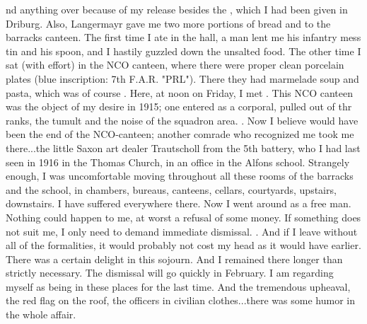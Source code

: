 nd anything over because of my release besides the , which I had been given in Driburg. Also, Langermayr gave me two more portions of bread and  to the barracks canteen. The first time I ate in the  hall, a man lent me his infantry mess tin and his spoon, and I hastily guzzled down the unsalted food. The other time I sat (with effort) in the NCO canteen, where there were proper clean porcelain plates (blue inscription: 7th F.A.R. "PRL"). There they had marmelade soup and pasta, which was of course . Here, at noon on Friday, I met . This NCO canteen was the object of my desire in 1915; one entered as a corporal, pulled out of thr ranks, the tumult and the noise of the squadron area. . Now I believe would have been the end of the NCO-canteen; another comrade who recognized me took me there...the little Saxon art dealer Trautscholl from the 5th battery, who I had last seen in 1916 in the Thomas Church,  in an office in the Alfons school. Strangely enough, I was uncomfortable moving throughout all these rooms of the barracks and the school, in chambers, bureaus, canteens, cellars, courtyards, upstairs, downstairs. I have suffered everywhere there. Now I went around as a free man. Nothing could happen to me, at worst a refusal of some money. If something does not suit me, I only need to demand immediate dismissal. . And if I leave without all of the formalities, it would probably not cost my head as it would have earlier. There was a certain delight in this sojourn. And I remained there longer than strictly necessary. The dismissal will go quickly in February. I am regarding myself as being in these places for the last time. And the tremendous upheaval, the red flag on the roof, the officers in civilian clothes...there was some humor in the whole affair.

